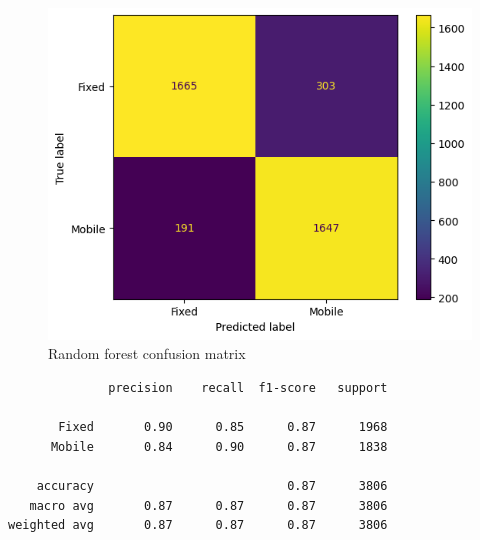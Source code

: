 \documentclass[
  letterpaper,
  DIV=11,
  numbers=noendperiod,
  oneside]{scrartcl}
\begin{document}
\begin{figure}[H]

{\centering \includegraphics{data-analytics_files/figure-latex/fig-randforest-output-1.png}

}

\caption{\label{fig-randforest}Random forest confusion matrix}

\end{figure}

\begin{verbatim}
              precision    recall  f1-score   support

       Fixed       0.90      0.85      0.87      1968
      Mobile       0.84      0.90      0.87      1838

    accuracy                           0.87      3806
   macro avg       0.87      0.87      0.87      3806
weighted avg       0.87      0.87      0.87      3806
\end{verbatim}

\hfill\break
\end{document}

